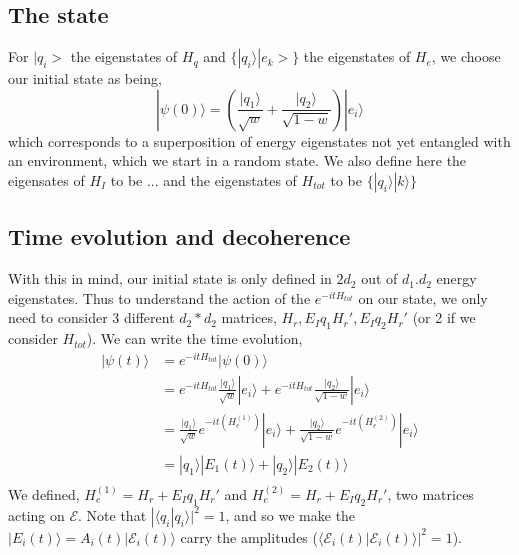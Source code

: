 \documentclass{article}
\begin{document}
\subsection{The state}

For $|q_i>$ the eigenstates of $H_q$ and $\{|q_i\rangle|e_k>\}$ the eigenstates of $H_e$, we choose our initial state as being,
\begin{equation}
    |\psi(0)\rangle=(\frac{|q_1\rangle}{\sqrt{w}}+\frac{|q_2\rangle}{\sqrt{1-w}})|e_i\rangle
\end{equation}
which corresponds to a superposition of energy eigenstates not yet entangled with an environment, which we start in a random state.
We also define here the eigensates of $H_I$ to be ... and the eigenstates of $H_{tot}$ to be $\{|q_i\rangle|k\rangle\}$

\subsection{Time evolution and decoherence}

With this in mind, our initial state is only defined in $2d_2$ out of $d_1.d_2$ energy eigenstates. Thus to understand the action of the $e^{-itH_{tot}}$ on our state, we only need to consider 3 different $d_2*d_2$ matrices, $H_r, E_Iq_1H_r', E_Iq_2H_r'$ (or 2 if we consider $H_{tot}$). We can write the time evolution,
\begin{align*}
    |\psi(t)\rangle &= e^{-itH_{tot}}|\psi(0)\rangle\\
    &=e^{-itH_{tot}}\frac{|q_1\rangle}{\sqrt{w}}|e_i\rangle+e^{-itH_{tot}}\frac{|q_2\rangle}{\sqrt{1-w}}|e_i\rangle\\
    &=\frac{|q_1\rangle}{\sqrt{w}}e^{-it(H_e^{(1)})}|e_i\rangle+\frac{|q_2\rangle}{\sqrt{1-w}}e^{-it(H_e^{(2)})}|e_i\rangle\\
    &= |q_1\rangle|E_1(t)\rangle+|q_2\rangle|E_2(t)\rangle\\
\end{align*}
We defined, $H_e^{(1)}=H_r + E_Iq_1H_r'$ and $H_e^{(2)}=H_r + E_Iq_2H_r'$, two matrices acting on $\mathcal{E}$.
Note that $|\langle q_i|q_i\rangle|^2=1$, and so we make the $|E_i(t)\rangle=A_i(t)|\mathcal{E}_i(t)\rangle$ carry the amplitudes ($\langle\mathcal{E}_i(t)|\mathcal{E}_i(t)\rangle|^2=1$). \\
\end{document}
